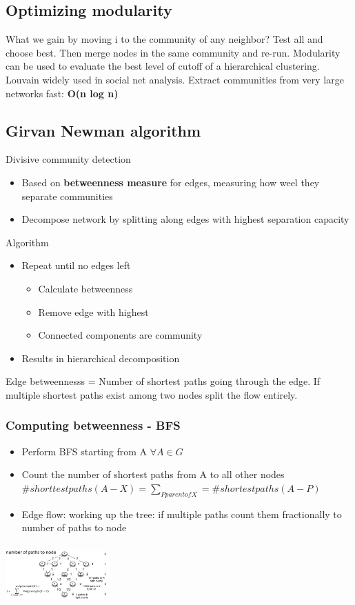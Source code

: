 \subsection{Optimizing modularity}
What we gain by moving i to the community of any neighbor? Test all
and choose best. Then merge nodes in the same community and
re-run. Modularity can be used to evaluate the best level of cutoff of
a hierarchical clustering. \\

Louvain widely used in social net analysis. Extract communities from
very large networks fast: \textbf{O(n log n)}

\subsection{Girvan Newman algorithm}
Divisive community detection
\begin{itemize}
\item Based on \textbf{betweenness measure} for edges, measuring how
  weel they separate communities
\item Decompose network by splitting along edges with highest
  separation capacity
\end{itemize}

Algorithm
\begin{itemize}
\item Repeat until no edges left
  \begin{itemize}
  \item Calculate betweenness
  \item Remove edge with highest
  \item Connected components are community
  \end{itemize}
\item  Results in hierarchical decomposition
\end{itemize}

Edge betweennesss = Number of shortest paths going through the
edge. If multiple shortest paths exist among two nodes split the flow
entirely.

\subsubsection{Computing betweenness - BFS}
\begin{itemize}
\item Perform BFS starting from A $ \forall A \in G $
\item Count the number of shortest paths from A to all other nodes
  $ \#shorttestpaths(A - X) = \sum_{P parent of X} = \#shortestpaths(A -
  P) $
\item Edge flow: working up the tree: if multiple paths count them
  fractionally to number of paths to node
\end{itemize}
\includegraphics[width=150px,height=90px]{edgeflow}

